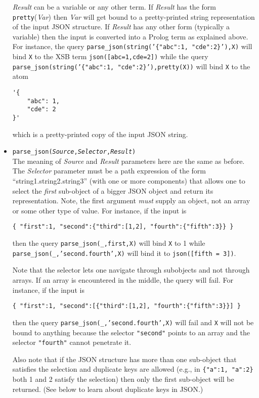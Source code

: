 \begin{itemize}
  \emph{Result} can be a variable or any other term. If  \emph{Result}
  has the form \texttt{pretty}(\emph{Var})  then \emph{Var}
  will get bound to a pretty-printed string representation of the input
  JSON structure. If \emph{Result} has any other form (typically a
  variable) then the input is converted into a Prolog term as explained
  above.
  For instance, the query 
  \texttt{parse\_json(string('\{"abc":1, "cde":2\}'),X)}
  will bind \texttt{X} to the XSB term \texttt{json([abc=1,cde=2])}
  while the query  \texttt{parse\_json(string('\{"abc":1,
    "cde":2\}'),pretty(X))}  will bind \texttt{X} to the atom
\begin{verbatim}
'{
    "abc": 1,
    "cde": 2
}'
\end{verbatim}
  which is a pretty-printed copy of the input JSON string.
\item
  \texttt{parse\_json(\emph{Source},\emph{Selector},\emph{Result})}\\
  The meaning of \emph{Source}  and \emph{Result}  parameters here are the
  same as before.
  The \emph{Selector} parameter must be a path expression of the form
  ``string1.string2.string3'' (with one or more components) that allows
  one to select the \emph{first} sub-object of a bigger JSON object and
  return its
  representation. Note, the first argument \emph{must} supply an object, not an
  array or some other type of value. For instance, if the input is
\begin{verbatim}
{ "first":1, "second":{"third":[1,2], "fourth":{"fifth":3}} }  
\end{verbatim}
  then the query \texttt{parse\_json(\_,first,X)} will bind
  \texttt{X} to 1 while
  \texttt{parse\_json(\_,'second.fourth',X)}
  will bind it to
  \texttt{json([fifth = 3])}.

  Note that the selector lets one navigate through subobjects and not
  through arrays. If an array is encountered in the middle, the query will
  fail. For instance, if the input is
\begin{verbatim}
{ "first":1, "second":[{"third":[1,2], "fourth":{"fifth":3}}] }  
\end{verbatim}
  then the query
  \texttt{parse\_json(\_,'second.fourth',X)}
  will fail and \texttt{X} will not be bound to anything because the
  selector \texttt{"second"} points to an array and the selector
  \texttt{"fourth"} cannot penetrate it. 

  Also note that if the JSON structure has more than one sub-object that
  satisfies the selection and duplicate keys are allowed
  (e.g., in \texttt{\{"a":1, "a":2\}} both 1 and 2 satisfy the selection)
  then only the first sub-object will be returned. (See below to learn about
  duplicate keys in JSON.)


\end{itemize}

